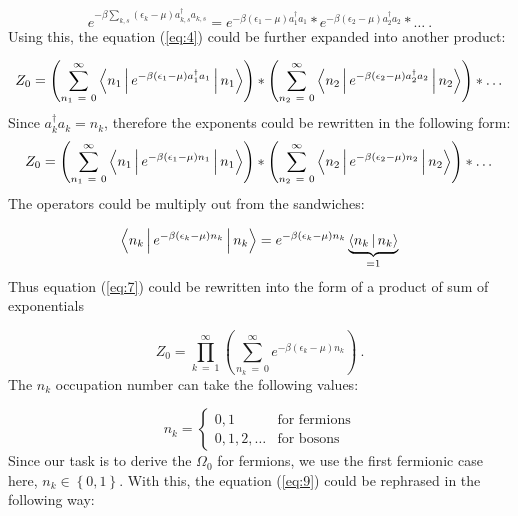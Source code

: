 \begin{equation} \label{eq:5}
e^{-\beta \sum_{k,s} \left( \epsilon_{k} - \mu \right) a_{k,s}^{\dagger} a_{k,s}}
=
e^{-\beta \left( \epsilon_{1} - \mu \right) a_{1}^{\dagger} a_{1}}
*
e^{-\beta \left( \epsilon_{2} - \mu \right) a_{2}^{\dagger} a_{2}}
*
\dots
\ .
\end{equation}
Using this, the equation (\ref{eq:4}) could be further expanded into another product:

\begin{equation} \label{eq:6}
Z_{0}
=
\left( \sum_{n_{1}\ =\ 0}^{\infty} \Braket{n_{1}|e^{-\beta \left( \epsilon_{1} - \mu \right) a_{1}^{\dagger} a_{1}}|n_{1}} \right)
*
\left( \sum_{n_{2}\ =\ 0}^{\infty} \Braket{n_{2}|e^{-\beta \left( \epsilon_{2} - \mu \right) a_{2}^{\dagger} a_{2}}|n_{2}} \right)
*
\dots
\end{equation}
Since $a^{\dagger}_{k} a_{k} = n_{k}$, therefore the exponents could be rewritten in the following form:
\begin{equation} \label{eq:7}
Z_{0}
=
\left( \sum_{n_{1}\ =\ 0}^{\infty} \Braket{n_{1}|e^{-\beta \left( \epsilon_{1} - \mu \right) n_{1}}|n_{1}} \right)
*
\left( \sum_{n_{2}\ =\ 0}^{\infty} \Braket{n_{2}|e^{-\beta \left( \epsilon_{2} - \mu \right) n_{2}}|n_{2}} \right)
*
\dots
\end{equation}
The operators could be multiply out from the sandwiches:

\begin{equation} \label{eq:8}
\Braket{n_{k}|e^{-\beta \left( \epsilon_{k} - \mu \right) n_{k}}|n_{k}}
=
e^{-\beta \left( \epsilon_{k} - \mu \right) n_{k}} \underbrace{\Braket{n_{k}|n_{k}}}_{=1}
\end{equation}
Thus equation (\ref{eq:7}) could be rewritten into the form of a product of sum of exponentials

\begin{equation} \label{eq:9}
Z_{0}
=
\prod_{k\ =\ 1}^{\infty}
\left(
\sum_{n_{k}\ =\ 0}^{\infty} e^{-\beta \left( \epsilon_{k} - \mu \right) n_{k}}
\right)
\ .
\end{equation}
The $n_{k}$ occupation number can take the following values:

\begin{equation*}
n_{k}
=
\begin{cases}
0,1 & \text{for fermions} \\
0,1,2,\dots & \text{for bosons}
\end{cases}
\end{equation*}
Since our task is to derive the $\Omega_{0}$ for fermions, we use the first fermionic case here, $n_{k} \in \left\{ 0,1 \right\}$. With this, the equation (\ref{eq:9}) could be rephrased in the following way:


